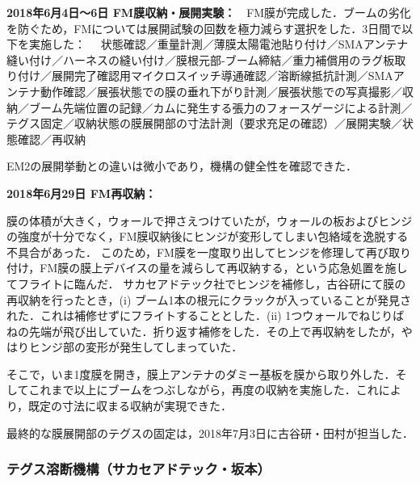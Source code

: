 \noindent \textbf{2018年6月4日～6日 FM膜収納・展開実験：}　FM膜が完成した．ブームの劣化を防ぐため，FMについては展開試験の回数を極力減らす選択をした．3日間で以下を実施した：
\noindent　状態確認／重量計測／薄膜太陽電池貼り付け／SMAアンテナ縫い付け／ハーネスの縫い付け／膜根元部-ブーム締結／重力補償用のラグ板取り付け／展開完了確認用マイクロスイッチ導通確認／溶断線抵抗計測／SMAアンテナ動作確認／展張状態での膜の垂れ下がり計測／展張状態での写真撮影／収納／ブーム先端位置の記録／カムに発生する張力のフォースゲージによる計測／テグス固定／収納状態の膜展開部の寸法計測（要求充足の確認）／展開実験／状態確認／再収納

EM2の展開挙動との違いは微小であり，機構の健全性を確認できた．\vspace{2mm}

\noindent \textbf{2018年6月29日 FM再収納：}　

膜の体積が大きく，ウォールで押さえつけていたが，ウォールの板およびヒンジの強度が十分でなく，FM膜収納後にヒンジが変形してしまい包絡域を逸脱する不具合があった．
このため，FM膜を一度取り出してヒンジを修理して再び取り付け，FM膜の膜上デバイスの量を減らして再収納する，という応急処置を施してフライトに臨んだ．
サカセアドテック社でヒンジを補修し，古谷研にて膜の再収納を行ったとき，(i) ブーム1本の根元にクラックが入っていることが発見された．これは補修せずにフライトすることとした．(ii) 1つウォールでねじりばねの先端が飛び出していた．折り返す補修をした．その上で再収納をしたが，やはりヒンジ部の変形が発生してしまっていた．

そこで，いま1度膜を開き，膜上アンテナのダミー基板を膜から取り外した．そしてこれまで以上にブームをつぶしながら，再度の収納を実施した．これにより，既定の寸法に収まる収納が実現できた．

最終的な膜展開部のテグスの固定は，2018年7月3日に古谷研・田村が担当した．

\subsubsection{テグス溶断機構（サカセアドテック・坂本）}

